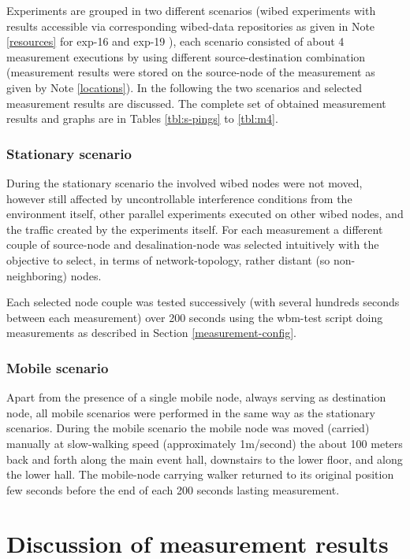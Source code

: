\documentclass[a4paper,12pt,twoside]{article}
\begin{document}
Experiments are grouped in two different scenarios (wibed experiments
with results accessible via corresponding wibed-data repositories as
given in Note \ref{resources} for exp-16 and exp-19 ), each scenario
consisted of about 4 measurement executions by using different
source-destination combination (measurement results were stored on
the source-node of the measurement as given by Note \ref{locations}).
In the following the two scenarios and selected measurement results
are discussed.  The complete set of obtained measurement results and
graphs are in Tables \ref{tbl:s-pings} to \ref{tbl:m4}.

\subsubsection{Stationary scenario}

During the stationary scenario the involved wibed nodes were not
moved, however still affected by uncontrollable interference
conditions from the environment itself, other parallel experiments
executed on other wibed nodes, and the traffic created by the
experiments itself. For each measurement a different couple of
source-node and desalination-node was selected intuitively with the
objective to select, in terms of network-topology, rather distant
(so non-neighboring) nodes.

Each selected node couple was tested successively (with several
hundreds seconds between each measurement) over 200 seconds using the
wbm-test script \cite{wbm-test} doing measurements as described in
Section \ref{measurement-config}.

\subsubsection{Mobile scenario}

Apart from the presence of a single mobile node, always serving as
destination node, all mobile scenarios were performed in the same way
as the stationary scenarios. During the mobile scenario the mobile
node was moved (carried) manually at slow-walking speed (approximately
1m/second) the about 100 meters back and forth along the main event
hall, downstairs to the lower floor, and along the lower hall.  The
mobile-node carrying walker returned to its original position few
seconds before the end of each 200 seconds lasting measurement.



\section{Discussion of measurement results}
\end{document}
